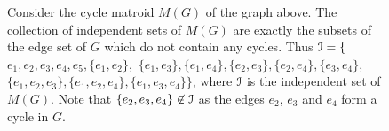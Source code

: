 \begin{figure}
\centering
{}

\caption{Consider the cycle matroid $M(G)$ of the graph above. The collection
of independent sets of $M(G)$ are exactly the subsets of the edge set of $G$
which do not contain any cycles. Thus $\mathcal{I} = \{$$e_1,e_2,e_3,e_4,e_5,$$\{e_1,e_2\},$
$\{e_1,e_3\},$$\{e_1,e_4\},$$\{e_2,e_3\},$$\{e_2,e_4\},$$\{e_3,e_4\},$$\{e_1,e_2,e_3\},$$
\{e_1,e_2,e_4\},$$\{e_1,e_3,e_4\}$$\}$, where $\mathcal{I}$ is the independent set of
$M(G)$. Note that $\{e_2,e_3,e_4\} \not\in \mathcal{I}$ as the edges $e_2$, $e_3$ and
$e_4$ form a cycle in $G$.}
\label{fig:cycle-matroid-example}
\end{figure}
